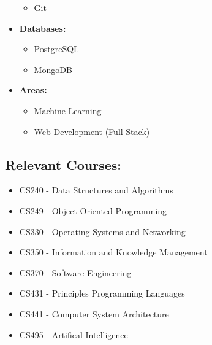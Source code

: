 \documentclass[12pt, oneside, a4paper]{article}
\begin{document}
\begin{paracol}{2}
\begin{leftcolumn}
\begin{itemize}
\begin{itemize}
              \item Git
          \end{itemize}
    \item \textbf{Databases:}
          \begin{itemize}
              \item PostgreSQL
              \item MongoDB
          \end{itemize}
    \item \textbf{Areas:}
        \begin{itemize}
            \item Machine Learning
            \item Web Development (Full Stack)
        \end{itemize}
\end{itemize}
\end{leftcolumn}

\begin{rightcolumn}
    \section*{Relevant Courses:}
\begin{itemize}
    \scriptsize
    \item CS240 - Data Structures and Algorithms
    \item CS249 - Object Oriented Programming
    \item CS330 - Operating Systems and Networking
    \item CS350 - Information and Knowledge Management
    \item CS370 - Software Engineering
    \item CS431 - Principles Programming Languages
    \item CS441 - Computer System Architecture
    \item CS495 - Artifical Intelligence
\end{itemize}
\end{rightcolumn}
\end{paracol}
        
\end{document}
